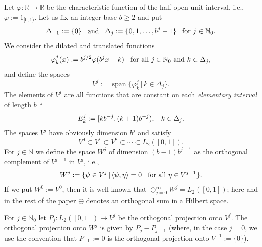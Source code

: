 \documentclass[12pt]{article}
\DeclareMathOperator{\spann}{span}
\newcommand{\NN}{\mathbb{N}}
\newcommand{\RR}{\mathbb{R}}
\begin{document}
Let $\varphi: \RR\to \RR$ be the characteristic function of the half-open unit interval,
i.e., $\varphi := 1_{[0,1)}$. Let us fix an integer base $b\ge 2$ and put 
$$\Delta_{-1} := \{0\} \hspace{2ex}\text{and}\hspace{2ex}\Delta_j := \{0,1,\ldots, b^j-1\} \hspace{2ex}\text{for $j\in{\NN}_0$.} $$
We consider the dilated and translated functions
$$\varphi^j_k(x) := b^{j/2}\varphi(b^jx -k) \hspace{2ex}
\text{for all $j\in{\NN}_0$ and $k\in \Delta_j$,}$$
and define the spaces 
$$V^j := \spann\{ \varphi^j_k \,|\, k\in\Delta_j\}.$$
The elements of $V^j$ are all functions that are constant on 
each \emph{elementary interval} of length $b^{-j}$
\begin{equation*}
E^j_k := [k b^{-j}, (k+1)b^{-j}), \hspace{2ex} k\in\Delta_j.
\end{equation*}
The spaces $V^j$ have obviously dimension $b^j$ and satisfy
$$V^0 \subset V^1 \subset V^2 \subset \cdots \subset L_2([0,1]).$$
For $j\in \NN$ we define the space $W^j$ of dimension $(b-1)b^{j-1}$
as the orthogonal complement of $V^{j-1}$ in $V^{j}$, i.e.,
$$W^j := \{\psi\in V^j \,|\, \langle \psi, \eta\rangle = 0
\hspace{2ex}\text{for all $\eta\in V^{j-1}$} \}.$$
If we put $W^0 := V^0$, then it is well
known that $\oplus^\infty_{j=0} W^j = L_2([0,1])$; %
here and in the rest of the paper $\oplus$ denotes an orthogonal sum in a Hilbert space.


For $j \in \NN_0$ let $P_j: L_2([0,1]) \to V^j$ be the orthogonal
projection onto $V^j$. The orthogonal projection onto
$W^j$ is given by $P_j - P_{j-1}$ (where, in the case $j=0$, we use the
convention that $P_{-1}:=0$ is the orthogonal projection onto
$V^{-1}:=\{0\}$).
\end{document}
